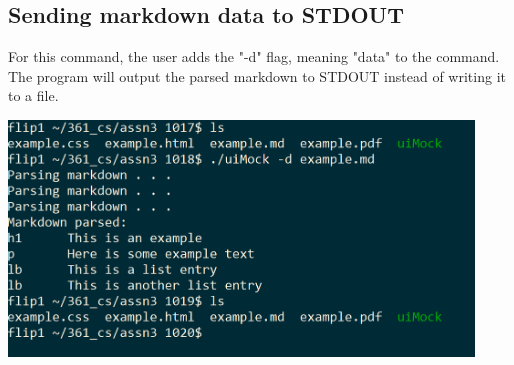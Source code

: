 \subsection{Sending markdown data to STDOUT}

For this command, the user adds the "-d" flag, meaning "data" to the command. The program will output the parsed markdown to STDOUT instead of writing it to a file.

\noindent\includegraphics[width=350pt]{images/mdrender_stdout.png}
